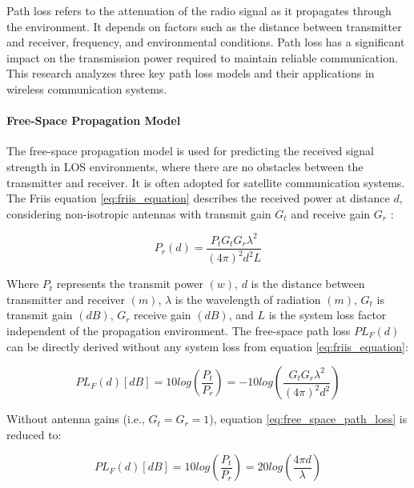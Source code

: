 Path loss refers to the attenuation of the radio signal as it propagates through the environment. It depends on factors such as the distance between transmitter and receiver, frequency, and environmental conditions. Path loss has a significant impact on the transmission power required to maintain reliable communication. This research analyzes three key path loss models and their applications in wireless communication systems.

\paragraph{Free-Space Propagation Model}

The free-space propagation model is used for predicting the received signal strength in \gls{LOS} environments, where there are no obstacles between the transmitter and receiver. It is often adopted for satellite communication systems. The Friis equation \ref{eq:friis_equation} describes the received power at distance $d$, considering non-isotropic antennas with transmit gain $G_t$ and receive gain $G_r$ \cite{cho2010mimo}:

\begin{equation}\label{eq:friis_equation}
    P_r\left(d\right)=\frac{P_tG_tG_r\lambda^2}{\left(4\pi\right)^2d^2L}
\end{equation}

Where $P_t$ represents the transmit power $\left(w\right)$, $d$ is the distance between transmitter and receiver $\left(m\right)$, $\lambda$ is the wavelength of radiation $\left(m\right)$, $G_t$ is transmit gain $(dB)$, $G_r$ receive gain $(dB)$, and $L$ is the system loss factor independent of the propagation environment. The free-space path loss ${PL}_F\left(d\right)$ can be directly derived without any system loss from equation \ref{eq:friis_equation}:

\begin{equation}\label{eq:free_space_path_loss}
    PL_F\left(d\right)\left[dB\right]=10log\left(\frac{P_t}{P_r}\right)=-10log\left(\frac{G_tG_r\lambda^2}{\left(4\pi\right)^2d^2}\right)
\end{equation}

Without antenna gains (i.e., $G_t=G_r=1$), equation \ref{eq:free_space_path_loss} is reduced to:

\begin{equation}\label{eq:free_space_path_loss_no_antenna_gain}
    PL_F\left(d\right)\left[dB\right]=10log\left(\frac{P_t}{P_r}\right)=20log\left(\frac{4\pi d}{\lambda}\right)
\end{equation}

